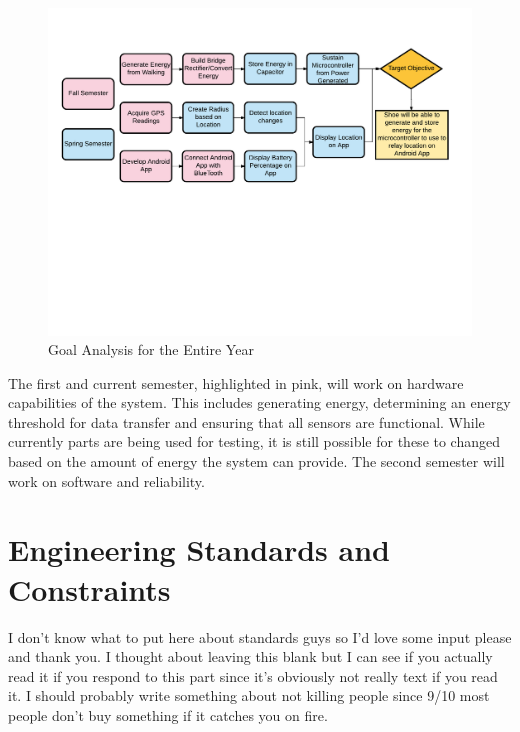 \documentclass[letterpaper, 12 pt, onecolumn, hidelinks]{ieeetran}
\begin{document}
\begin{figure}[h]
	\begin{center}
		\includegraphics[trim=25 275 40 75, clip, width=\columnwidth]{ProjectStrideGoalAnaylsis.pdf}
	\end{center}
	\vspace{-1em}
	\caption{\label{fig:Flowchart}Goal Analysis for the Entire Year}
\end{figure}

The first and current semester, highlighted in pink, will work on hardware capabilities of the system. This includes generating energy, determining an energy threshold for data transfer and ensuring that all sensors are functional. While currently parts are being used for testing, it is still possible for these to changed based on the amount of energy the system can provide. The second semester will work on software and reliability.

\section{Engineering Standards and Constraints}\label{sec:Standards}

I don't know what to put here about standards guys so I'd love some input please and thank you. I thought about leaving this blank but I can see if you actually read it if you respond to this part since it's obviously not really text if you read it. I should probably write something about not killing people since 9/10 most people don't buy something if it catches you on fire.
\end{document}
